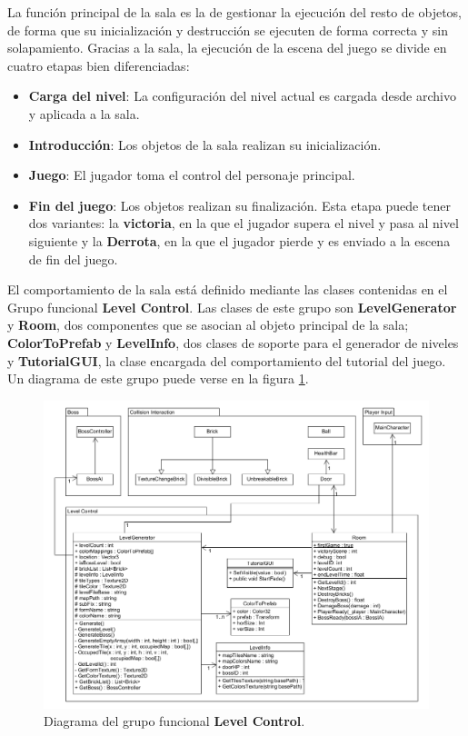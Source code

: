 La función principal de la sala es la de gestionar la ejecución del resto de objetos, de forma que su inicialización y destrucción se ejecuten de forma correcta y sin solapamiento. Gracias a la sala, la ejecución de la escena del juego se divide en cuatro etapas bien diferenciadas:
\begin{itemize}
\item \textbf{Carga del nivel}: La configuración del nivel actual es cargada desde archivo y aplicada a la sala.
\item \textbf{Introducción}: Los objetos de la sala realizan su inicialización.
\item \textbf{Juego}: El jugador toma el control del personaje principal.
\item \textbf{Fin del juego}: Los objetos realizan su finalización. Esta etapa puede tener dos variantes: la \textbf{victoria}, en la que el jugador supera el nivel y pasa al nivel siguiente y la \textbf{Derrota}, en la que el jugador pierde y es enviado a la escena de fin del juego.
\end{itemize}

El comportamiento de la sala está definido mediante las clases contenidas en el Grupo funcional \textbf{Level Control}. Las clases de este grupo son \textbf{LevelGenerator} y \textbf{Room}, dos componentes que se asocian al objeto principal de la sala; \textbf{ColorToPrefab} y \textbf{LevelInfo}, dos clases de soporte para el generador de niveles y \textbf{TutorialGUI}, la clase encargada del comportamiento del tutorial del juego. Un diagrama de este grupo puede verse en la figura \ref{diagrama_clases_niveles}.
\begin{figure}[!t]
    \centering
    \includegraphics[width=1\textwidth]{images/estructura/niveles/class_diagram}
    \caption{Diagrama del grupo funcional \textbf{Level Control}.}
    \label{diagrama_clases_niveles}
\end{figure}

